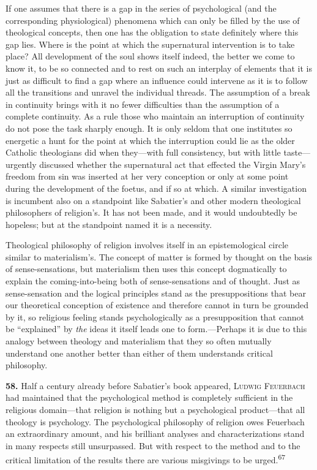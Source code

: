 \documentclass[12pt,a4paper]{book}
\newcommand{\opage}[1]{\marginnote{\footnotesize\textit{[#1]}}}
\begin{document}
If one assumes that there is a gap in the series of psychological (and the corresponding
physiological) phenomena which can only be filled by the use of theological concepts, then one
has the obligation to state definitely where this gap lies. Where is the point at which the
supernatural intervention is to take place? All development of the soul shows itself indeed, the
better we come to know it, to be so connected and to rest on such an interplay of elements that
it is just as difficult to find a gap where an influence could intervene as it is to follow all
the transitions and unravel the individual threads. The assumption of a break in continuity brings
with it no fewer difficulties than the assumption of a complete continuity. As a rule those who
maintain an interruption of continuity do not pose the task sharply enough. It is only seldom that
one institutes so energetic a hunt for the point at which the interruption could lie as the older
Catholic theologians did when they---with full consistency, but with little taste---urgently
discussed whether the supernatural act that effected the Virgin Mary's freedom from sin was
inserted at her very conception or only at some point during the development of the foetus, and if
so at which. A similar investigation is incumbent also on a standpoint like Sabatier's and other
modern theological philosophers of religion's. It has not been made, and it would undoubtedly be
hopeless; but at the standpoint named it is a necessity.

Theological philosophy of religion involves itself in an epistemological circle similar to
materialism's. The concept of matter is formed by thought on the basis of sense-sensations, but
materialism then uses this concept dogmatically to explain the coming-into-being both of
sense-sensations and of 
\opage{129}thought. Just as sense-sensation and the logical principles stand as the
presuppositions that bear our theoretical conception of existence and therefore cannot in turn be
grounded by it, so religious feeling stands psychologically as a presupposition that cannot be
``explained'' by \emph{the} ideas it itself leads one to form.---Perhaps it is due to this analogy
between theology and materialism that they so often mutually understand one another better than
either of them understands critical philosophy.

\medskip

\noindent\textbf{58.} Half a century already before Sabatier's book appeared, \textsc{Ludwig
Feuerbach} had maintained that the psychological method is completely sufficient in the religious
domain---that religion is nothing but a psychological product---that all theology is psychology.
The psychological philosophy of religion owes Feuerbach an extraordinary amount, and his brilliant
analyses and characterizations stand in many respects still unsurpassed. But with respect to the
method and to the critical limitation of the results there are various misgivings to be
urged.\textsuperscript{67}
\end{document}

